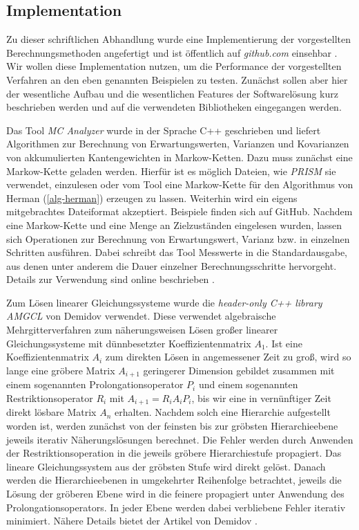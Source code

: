 \documentclass[a4paper]{article}
\newcommand{\mc}{Markow-Kette}
\theoremstyle{nonumberplain}
\begin{document}
\subsection{Implementation}

Zu dieser schriftlichen Abhandlung wurde eine Implementierung der vorgestellten Berechnungsmethoden angefertigt und ist öffentlich auf \textit{github.com} einsehbar \cite{MCA}. Wir wollen diese Implementation nutzen, um die Performance der vorgestellten Verfahren an den eben genannten Beispielen zu testen. Zunächst sollen aber hier der wesentliche Aufbau und die wesentlichen Features der Softwarelösung kurz beschrieben werden und auf die verwendeten Bibliotheken eingegangen werden.


Das Tool \textit{MC Analyzer} \cite{MCA} wurde in der Sprache C++ geschrieben und liefert Algorithmen zur Berechnung von Erwartungswerten, Varianzen und Kovarianzen von akkumulierten Kantengewichten in \mc n.
Dazu muss zunächst eine \mc{} geladen werden. Hierfür ist es möglich Dateien, wie \textit{PRISM} \cite{PRISMCS} sie verwendet, einzulesen oder vom Tool eine \mc{} für den Algorithmus von Herman (\ref{alg-herman}) erzeugen zu lassen. Weiterhin wird ein eigens mitgebrachtes Dateiformat akzeptiert. Beispiele finden sich auf GitHub. Nachdem eine \mc{} und eine Menge an Zielzuständen eingelesen wurden, lassen sich Operationen zur Berechnung von Erwartungswert, Varianz bzw. \cov{} in einzelnen Schritten ausführen. Dabei schreibt das Tool Messwerte in die Standardausgabe, aus denen unter anderem die Dauer einzelner Berechnungsschritte hervorgeht. Details zur Verwendung sind online beschrieben \cite{MCA}.


Zum Lösen linearer Gleichungssysteme wurde die \textit{header-only C++ library AMGCL} von Demidov \cite{Demidov2019} verwendet. Diese verwendet algebraische Mehrgitterverfahren zum näherungsweisen Lösen großer linearer Gleichungssysteme mit dünnbesetzter Koeffizientenmatrix $A_1$. 
Ist eine Koeffizientenmatrix $A_i$ zum direkten Lösen in angemessener Zeit zu groß, wird so lange eine gröbere Matrix $A_{i+1}$ geringerer Dimension gebildet zusammen mit einem sogenannten Prolongationsoperator $P_i$ und einem sogenannten Restriktionsoperator $R_i$ mit $A_{i+1} = R_iA_iP_i$, bis wir eine in vernünftiger Zeit direkt lösbare Matrix $A_n$ erhalten. Nachdem solch eine Hierarchie aufgestellt worden ist, werden zunächst von der feinsten bis zur gröbsten Hierarchieebene jeweils iterativ Näherungslösungen berechnet. Die Fehler werden durch Anwenden der Restriktionsoperation in die jeweils gröbere Hierarchiestufe propagiert. Das lineare Gleichungssystem aus der gröbsten Stufe wird direkt gelöst. Danach werden die Hierarchieebenen in umgekehrter Reihenfolge betrachtet, jeweils die Lösung der gröberen Ebene wird in die feinere propagiert unter Anwendung des Prolongationsoperators. In jeder Ebene werden dabei verbliebene Fehler iterativ minimiert. Nähere Details bietet der Artikel von Demidov \cite{Demidov2019}.
\end{document}
